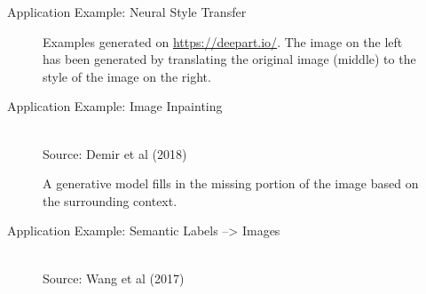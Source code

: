 \begin{frame} {Application Example: Neural Style Transfer}
\begin{figure}
    \caption{Examples generated on \url{https://deepart.io/}. The image on the left has been generated by translating the original image (middle) to the style of the image on the right. }
    \end{figure}

\end{frame}


\begin{frame} {Application Example: Image Inpainting}

    \vspace{8mm}
    \begin{figure}
    \centering
    \tiny{\\Source: Demir et al (2018)}
    \caption{A generative model fills in the missing portion of the image based on the surrounding context.}
    \end{figure}

\end{frame}





 \begin{frame} {Application Example: Semantic Labels --> Images}

     \begin{figure}
     \centering
     \tiny{\\Source: Wang et al (2017)}
     \end{figure}

 \end{frame}


